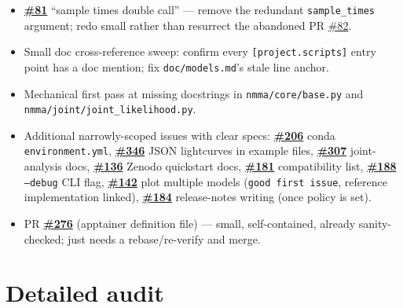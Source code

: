 \documentclass[10pt]{article}
\newcommand{\code}[1]{\texttt{#1}}
\begin{document}
\begin{itemize}
  instead of hitting the API from every MPI rank.
\item \textbf{\href{https://github.com/nuclear-multimessenger-astronomy/nmma/issues/81}{\#81}} ``sample times double call'' --- remove the redundant
  \code{sample\_times} argument; redo small rather than resurrect the abandoned
  PR \href{https://github.com/nuclear-multimessenger-astronomy/nmma/issues/82}{\#82}.
\item Small doc cross-reference sweep: confirm every \code{[project.scripts]}
  entry point has a doc mention; fix \code{doc/models.md}'s stale line anchor.
\item Mechanical first pass at missing docstrings in \code{nmma/core/base.py} and
  \code{nmma/joint/joint\_likelihood.py}.
\item Additional narrowly-scoped issues with clear specs: \textbf{\href{https://github.com/nuclear-multimessenger-astronomy/nmma/issues/206}{\#206}} conda
  \code{environment.yml}, \textbf{\href{https://github.com/nuclear-multimessenger-astronomy/nmma/issues/346}{\#346}} JSON lightcurves in example files,
  \textbf{\href{https://github.com/nuclear-multimessenger-astronomy/nmma/issues/307}{\#307}} joint-analysis docs, \textbf{\href{https://github.com/nuclear-multimessenger-astronomy/nmma/issues/136}{\#136}} Zenodo quickstart docs,
  \textbf{\href{https://github.com/nuclear-multimessenger-astronomy/nmma/issues/181}{\#181}} compatibility list, \textbf{\href{https://github.com/nuclear-multimessenger-astronomy/nmma/issues/188}{\#188}} \code{--debug} CLI flag,
  \textbf{\href{https://github.com/nuclear-multimessenger-astronomy/nmma/issues/142}{\#142}} plot multiple models (\code{good first issue}, reference
  implementation linked), \textbf{\href{https://github.com/nuclear-multimessenger-astronomy/nmma/issues/184}{\#184}} release-notes writing (once policy is
  set).
\item PR \textbf{\href{https://github.com/nuclear-multimessenger-astronomy/nmma/issues/276}{\#276}} (apptainer definition file) --- small, self-contained,
  already sanity-checked; just needs a rebase/re-verify and merge.
\end{itemize}

\section{Detailed audit}
\end{document}
